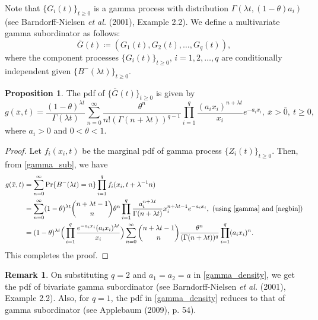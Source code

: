 \documentclass[12pt,oneside,reqno]{amsart}
\numberwithin{equation}{section}
\theoremstyle{definition}
\numberwithin{equation}{section}
\newtheorem{remark}{\bf Remark}[section]
\newtheorem{proposition}{Proposition}[section]
\theoremstyle{remarkstyle}
\begin{document}
Note that $\{G_i(t)\}_{t\ge0}$ is a gamma process with distribution $\Gamma(\lambda t, (1 - \theta) a_i)$ (see Barndorff-Nielsen \textit{et al.} (2001), Example 2.2). We define a multivariate gamma subordinator as follows:
\begin{equation}\label{gamma_sub}
\bar{G}(t) \coloneqq (G_1(t), G_2(t),\dots,G_q(t)),
\end{equation}
 where the component processes $\{G_i(t)\}_{t\ge 0}$, $i=1,2,\dots,q$ are conditionally independent given $\{B^{-}(\lambda t)\}_{t\ge 0}$.
\begin{proposition}
The pdf of $\{\bar{G}(t)\}_{t\ge 0}$ is given by 
\small{\begin{equation}\label{gamma_density}
g(\bar{x},t)= \frac{(1-\theta)^{\lambda t}}{\Gamma(\lambda t)}\sum_{n=0}^{\infty}\frac{\theta^n}{n!(\Gamma(n+\lambda t))^{q-1}}\prod_{i=1}^{q}\frac{(a_ix_i)^{n+\lambda t}}{x_i}e^{-a_ix_i},\ \bar{x}>\bar{0}, \ t\ge0,
	\end{equation}}
where $a_i> 0$ and $0<\theta<1$.
\end{proposition}
\begin{proof}
Let $f_i(x_i,t)$ be the marginal pdf of gamma process $\{Z_i(t)\}_{t\ge 0}$. Then, from \eqref{gamma_sub}, we have
\begin{align*}
		g(\bar{x},t)&=\sum_{n=0}^{\infty}\mathrm{Pr}\{B^-(\lambda t)=n\}\prod_{i=1}^{q}f_i(x_i,t+\lambda^{-1}n)\\
		&=\sum_{n=0}^{\infty}(1-\theta)^{\lambda t}{n+\lambda t-1 \choose n}\theta^n\prod_{i=1}^{q}\frac{a_i^{n+\lambda t}}{\Gamma(n+\lambda t)}x_i^{n+\lambda t-1}e^{-a_ix_i},\ \text{(using \eqref{gamma} and \eqref{negbin})}\\
		&=(1-\theta)^{\lambda t}\Big(\prod_{i=1}^{q}\frac{e^{-a_ix_i}(a_ix_i)^{\lambda t}}{x_i}\Big)\sum_{n=0}^{\infty}{n+\lambda t-1 \choose n}\frac{\theta^n}{(\Gamma(n+\lambda t))^q}\prod_{i=1}^{q}(a_ix_i)^{n}.
	\end{align*}
 This completes the proof.
\end{proof}

\begin{remark}
On substituting $q=2$ and $a_1=a_2=a$ in \eqref{gamma_density}, we get the pdf of bivariate gamma subordinator (see Barndorff-Nielsen {\it et al.} (2001), Example 2.2). Also, for $q=1$, the pdf in \eqref{gamma_density} reduces to that of gamma subordinator (see Applebaum (2009), p. 54).
\end{remark}
\end{document}
